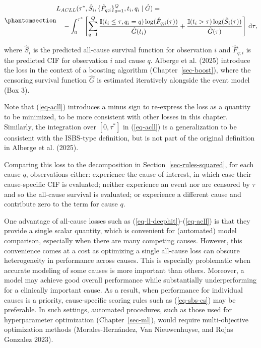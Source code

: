 \documentclass[
  letterpaper,
  krantz2]{style/krantz}
\begin{document}
\begin{equation}\phantomsection\label{eq-acll}{
\begin{aligned}
& L_{ACLL}(\tau^*, \hat{S}_i, \{\hat{F}_{q;i}\}^Q_{q=1}, t_i, q_i \mid \hat{G}) = \\
& \quad -\int^{\tau^*}_0 \left[\sum^Q_{q=1} \frac{\mathbb{I}(t_i \leq \tau, q_i = q)\log(\hat{F}_{q;i}(\tau))}{\hat{G}(t_i)} + \frac{\mathbb{I}(t_i > \tau)\log(\hat{S}_i(\tau))}{\hat{G}(\tau)}\right] \,\mathrm{d}\tau,
\end{aligned}
}\end{equation}

where \(\hat{S}_i\) is the predicted all-cause survival function for
observation \(i\) and \(\hat{F}_{q;i}\) is the predicted CIF for
observation \(i\) and cause \(q\).
Alberge et al. (2025) introduce the loss in the context of a boosting
algorithm (Chapter~\ref{sec-boost}), where the censoring survival
function \(\hat{G}\) is estimated iteratively alongside the event model
(Box 3).

Note that (\ref{eq-acll}) introduces a minus sign to re-express the loss
as a quantity to be minimized, to be more consistent with other losses
in this chapter. Similarly, the integration over \([0, \tau^*]\) in
(\ref{eq-acll}) is a generalization to be consistent with the ISBS-type
definition, but is not part of the original definition in Alberge et al.
(2025).

Comparing this loss to the decomposition in
Section~\ref{sec-rules-squared}, for each cause \(q\), observations
either: experience the cause of interest, in which case their
cause-specific CIF is evaluated; neither experience an event nor are
censored by \(\tau\) and so the all-cause survival is evaluated; or
experience a different cause and contribute zero to the term for cause
\(q\).

One advantage of all-cause losses such as
(\ref{eq-ll-deephit})-(\ref{eq-acll}) is that they provide a single
scalar quantity, which is convenient for (automated) model comparison,
especially when there are many competing causes. However, this
convenience comes at a cost as optimizing a single all-cause loss can
obscure heterogeneity in performance across causes. This is especially
problematic when accurate modeling of some causes is more important than
others. Moreover, a model may achieve good overall performance while
substantially underperforming for a clinically important cause. As a
result, when performance for individual causes is a priority,
cause-specific scoring rules such as (\ref{eq-sbs-cs}) may be
preferable. In such settings, automated procedures, such as those used
for hyperparameter optimization (Chapter~\ref{sec-ml}), would require
multi-objective optimization methods (Morales-Hernández, Van
Nieuwenhuyse, and Rojas Gonzalez
2023).
\end{document}
